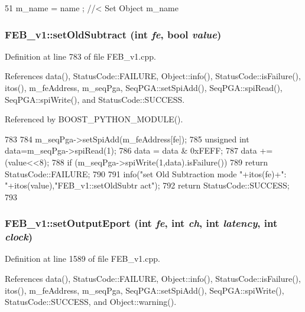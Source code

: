 \begin{DoxyCode}
51 { m_name  = name  ; } //< Set Object m_name
\end{DoxyCode}
\hypertarget{classFEB__v1_aec8198d5c03ddc5dd9151683f9506d00}{
\subsubsection[{setOldSubtract}]{ FEB\_\-v1::setOldSubtract (int {\em fe}, \/  bool {\em value})}}
\label{classFEB__v1_aec8198d5c03ddc5dd9151683f9506d00}


Definition at line 783 of file FEB\_\-v1.cpp.

References data(), StatusCode::FAILURE, Object::info(), StatusCode::isFailure(), itos(), m\_\-feAddress, m\_\-seqPga, SeqPGA::setSpiAdd(), SeqPGA::spiRead(), SeqPGA::spiWrite(), and StatusCode::SUCCESS.

Referenced by BOOST\_\-PYTHON\_\-MODULE().


\begin{DoxyCode}
783                                                      {
784   m_seqPga->setSpiAdd(m_feAddress[fe]);
785   unsigned int data=m_seqPga->spiRead(1);
786   data = data & 0xFEFF;
787   data += (value<<8);
788   if (m_seqPga->spiWrite(1,data).isFailure()){
789     return StatusCode::FAILURE;
790   }
791   info("set Old Subtraction mode "+itos(fe)+": "+itos(value),"FEB_v1::setOldSubtr
      act");
792   return StatusCode::SUCCESS;
793 }
\end{DoxyCode}
\hypertarget{classFEB__v1_ae8ed47630ca1408647e3eb5c1dfa0ec0}{
\subsubsection[{setOutputEport}]{ FEB\_\-v1::setOutputEport (int {\em fe}, \/  int {\em ch}, \/  int {\em latency}, \/  int {\em clock})}}
\label{classFEB__v1_ae8ed47630ca1408647e3eb5c1dfa0ec0}


Definition at line 1589 of file FEB\_\-v1.cpp.

References data(), StatusCode::FAILURE, Object::info(), StatusCode::isFailure(), itos(), m\_\-feAddress, m\_\-seqPga, SeqPGA::setSpiAdd(), SeqPGA::spiWrite(), StatusCode::SUCCESS, and Object::warning().


